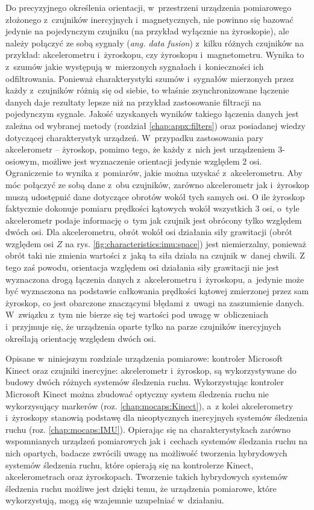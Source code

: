 Do precyzyjnego określenia orientacji, w~przestrzeni urządzenia pomiarowego złożonego z~czujników inercyjnych i~magnetycznych, nie powinno się bazować jedynie na pojedynczym czujniku (na przykład wyłącznie na żyroskopie), ale należy połączyć ze sobą sygnały (\emph{ang. data fusion}) z~kilku różnych czujników na przykład: akcelerometru i~żyroskopu, czy żyroskopu i~magnetometru. Wynika to z~szumów jakie występują w~mierzonych sygnałach i~konieczności ich odfiltrowania. Ponieważ charakterystyki szumów i~sygnałów mierzonych przez każdy z~czujników różnią się od siebie, to właśnie zsynchronizowane łączenie danych daje rezultaty lepsze niż na przykład zastosowanie filtracji na pojedynczym sygnale. Jakość uzyskanych wyników takiego łączenia danych jest zależna od wybranej metody (rozdział \ref{chap:appx:filters}) oraz posiadanej wiedzy dotyczącej charakterystyk urządzeń. W~przypadku zastosowania pary akcelerometr -- żyroskop, pomimo tego, że każdy z~nich jest urządzeniem 3-osiowym, możliwe jest wyznaczenie orientacji jedynie względem 2 osi. Ograniczenie to wynika z~pomiarów, jakie można uzyskać z~akcelerometru. Aby móc połączyć ze sobą dane z~obu czujników, zarówno akcelerometr jak i~żyroskop muszą udostępnić dane dotyczące obrotów wokół tych samych osi. O ile żyroskop faktycznie dokonuje pomiaru prędkości kątowych wokół wszystkich 3 osi, o~tyle akcelerometr podaje informację o~tym jak czujnik jest obrócony tylko względem dwóch osi. Dla akcelerometru, obrót wokół osi działania siły grawitacji (obrót względem osi $Z$ na rys. \ref{fig:characteristics:imu:space}) jest niemierzalny, ponieważ obrót taki nie zmienia wartości z~jaką ta siła działa na czujnik w~danej chwili. Z tego zaś powodu, orientacja względem osi działania siły grawitacji nie jest wyznaczona drogą łączenia danych z~akcelerometru i~żyroskopu, a~jedynie może być wyznaczona na podstawie całkowania prędkości kątowej zmierzonej przez sam żyroskop, co jest obarczone znaczącymi błędami z~uwagi na zaszumienie danych. W~związku z~tym nie bierze się tej wartości pod uwagę w~obliczeniach i~przyjmuje się, że urządzenia oparte tylko na parze czujników inercyjnych określają orientację względem dwóch osi.

Opisane w~niniejszym rozdziale urządzenia pomiarowe: kontroler Microsoft Kinect oraz czujniki inercyjne: akcelerometr i~żyroskop, są wykorzystywane do budowy dwóch różnych systemów śledzenia ruchu. Wykorzystując kontroler Microsoft Kinect można zbudować optyczny system śledzenia ruchu nie wykorzysujący markerów (roz. \ref{chap:mocaps:Kinect}), a~z kolei akcelerometry i~żyroskopy stanowią podstawę dla nieoptycznych inercyjnych systemów śledzenia ruchu (roz. \ref{chap:mocaps:IMU}). Opierając się na charakterystykach zarówno wspomnianych urządzeń pomiarowych jak i~cechach systemów śledzania ruchu na nich opartych, badacze zwrócili uwagę na możliwość tworzenia hybrydowych systemów śledzenia ruchu, które opierają się na kontrolerze Kinect, akcelerometrach oraz żyroskopach. Tworzenie takich hybrydowych systemów śledzenia ruchu możliwe jest dzięki temu, że urządzenia pomiarowe, które wykorzystują, mogą się wzajemnie uzupełniać w~działaniu.
																																																			
